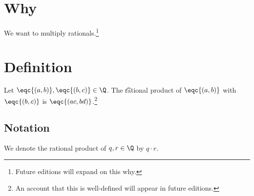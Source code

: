 

\section*{Why}

We want to multiply rationals.\footnote{Future editions will expand on this why.}

\section*{Definition}

Let $\eqc{(a, b)}, \eqc{(b, c)} \in \Q $.
The \t{rational product} of $\eqc{(a, b)}$ with $\eqc{(b, c)}$ is $\eqc{(ac , bd)}$.\footnote{An account that this is well-defined will appear in future editions.}

\subsection*{Notation}

We denote the rational product of $q, r \in \Q $ by $q \cdot r$.

\blankpage